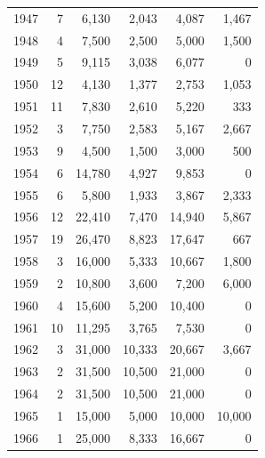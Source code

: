 \begin{longtable}{lrrrrr}
1947 & 7 & 6,130 & 2,043 & 4,087 & 1,467\\
1948 & 4 & 7,500 & 2,500 & 5,000 & 1,500\\
1949 & 5 & 9,115 & 3,038 & 6,077 & 0\\
1950 & 12 & 4,130 & 1,377 & 2,753 & 1,053\\
1951 & 11 & 7,830 & 2,610 & 5,220 & 333\\
1952 & 3 & 7,750 & 2,583 & 5,167 & 2,667\\
1953 & 9 & 4,500 & 1,500 & 3,000 & 500\\
1954 & 6 & 14,780 & 4,927 & 9,853 & 0\\
1955 & 6 & 5,800 & 1,933 & 3,867 & 2,333\\
1956 & 12 & 22,410 & 7,470 & 14,940 & 5,867\\
1957 & 19 & 26,470 & 8,823 & 17,647 & 667\\
1958 & 3 & 16,000 & 5,333 & 10,667 & 1,800\\
1959 & 2 & 10,800 & 3,600 & 7,200 & 6,000\\
1960 & 4 & 15,600 & 5,200 & 10,400 & 0\\
1961 & 10 & 11,295 & 3,765 & 7,530 & 0\\
1962 & 3 & 31,000 & 10,333 & 20,667 & 3,667\\
1963 & 2 & 31,500 & 10,500 & 21,000 & 0\\
1964 & 2 & 31,500 & 10,500 & 21,000 & 0\\
1965 & 1 & 15,000 & 5,000 & 10,000 & 10,000\\
1966 & 1 & 25,000 & 8,333 & 16,667 & 0\\
\bottomrule\end{longtable}


